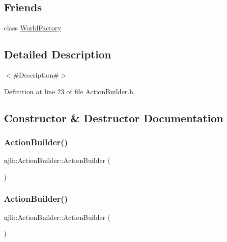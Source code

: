 \subsection*{Friends}
\begin{DoxyCompactItemize}
\item 
class \mbox{\hyperlink{classnjli_1_1_action_builder_acb96ebb09abe8f2a37a915a842babfac}{World\+Factory}}
\end{DoxyCompactItemize}


\subsection{Detailed Description}
$<$\#\+Description\#$>$ 

Definition at line 23 of file Action\+Builder.\+h.



\subsection{Constructor \& Destructor Documentation}
\mbox{\label{classnjli_1_1_action_builder_a4722e62e278de2668faf92c26fe7f71b}} 
\subsubsection{\texorpdfstring{Action\+Builder()}{ActionBuilder()}\hspace{0.1cm}{\footnotesize\ttfamily [1/2]}}
{\footnotesize\ttfamily njli\+::\+Action\+Builder\+::\+Action\+Builder (\begin{DoxyParamCaption}{ }\end{DoxyParamCaption})\hspace{0.3cm}{\ttfamily [protected]}}

\mbox{\label{classnjli_1_1_action_builder_abc0b4b0332ee13e9e1a8f7121196ef10}} 
\subsubsection{\texorpdfstring{Action\+Builder()}{ActionBuilder()}\hspace{0.1cm}{\footnotesize\ttfamily [2/2]}}
{\footnotesize\ttfamily njli\+::\+Action\+Builder\+::\+Action\+Builder (\begin{DoxyParamCaption}\item[{const \mbox{\hyperlink{classnjli_1_1_action_builder}{Action\+Builder}} \&}]{ }\end{DoxyParamCaption})\hspace{0.3cm}{\ttfamily [protected]}}


